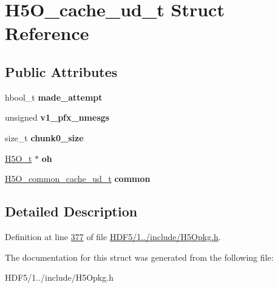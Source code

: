\hypertarget{struct_h5_o__cache__ud__t}{}\section{H5\+O\+\_\+cache\+\_\+ud\+\_\+t Struct Reference}
\label{struct_h5_o__cache__ud__t}
\subsection*{Public Attributes}
\begin{DoxyCompactItemize}
\item 
\mbox{\label{struct_h5_o__cache__ud__t_a40fd90879bccf8abb998d52f3e42dee1}} 
hbool\+\_\+t {\bfseries made\+\_\+attempt}
\item 
\mbox{\label{struct_h5_o__cache__ud__t_a4d96acafddcdb494ee2a01450fad30df}} 
unsigned {\bfseries v1\+\_\+pfx\+\_\+nmesgs}
\item 
\mbox{\label{struct_h5_o__cache__ud__t_ad3402ccb32ac6b9e2185f3449924e4dd}} 
size\+\_\+t {\bfseries chunk0\+\_\+size}
\item 
\mbox{\label{struct_h5_o__cache__ud__t_aac6155e64de024672c9cfa18216711d5}} 
\hyperlink{struct_h5_o__t}{H5\+O\+\_\+t} $\ast$ {\bfseries oh}
\item 
\mbox{\label{struct_h5_o__cache__ud__t_a3477a3e59ef766af1f9a70162e71add0}} 
\hyperlink{struct_h5_o__common__cache__ud__t}{H5\+O\+\_\+common\+\_\+cache\+\_\+ud\+\_\+t} {\bfseries common}
\end{DoxyCompactItemize}


\subsection{Detailed Description}


Definition at line \hyperlink{_h_d_f5_21_810_81_2include_2_h5_opkg_8h_source_l00377}{377} of file \hyperlink{_h_d_f5_21_810_81_2include_2_h5_opkg_8h_source}{H\+D\+F5/1../include/\+H5\+Opkg.\+h}.



The documentation for this struct was generated from the following file\+:\begin{DoxyCompactItemize}
\item 
H\+D\+F5/1../include/\+H5\+Opkg.\+h\end{DoxyCompactItemize}
